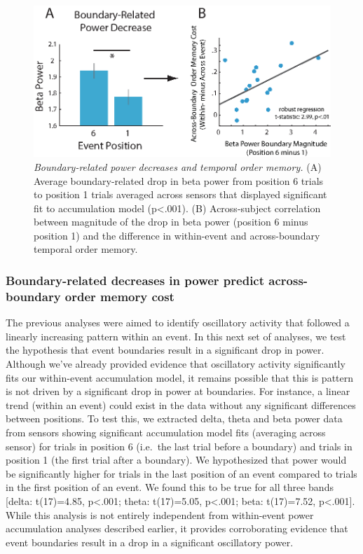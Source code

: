 \begin{figure}
  \centering
  \includegraphics[width=\textwidth]{figures/chapter2_figure5.eps}
  \caption[Boundary-related power decreases and temporal order memory.]{\textit{Boundary-related power decreases and temporal order memory.} (A) Average boundary-related drop in beta power from position 6 trials to position 1 trials averaged across sensors that displayed significant fit to accumulation model (p<.001).  (B) Across-subject correlation between magnitude of the drop in beta power (position 6 minus position 1) and the difference in within-event and across-boundary temporal order memory.}
  \label{chapter2_figure5}
\end{figure}

\subsubsection{Boundary-related decreases in power predict
across-boundary order memory
cost}\label{boundary-related-decreases-in-power-predict-across-boundary-order-memory-cost}

The previous analyses were aimed to identify oscillatory activity that
followed a linearly increasing pattern within an event. In this next set
of analyses, we test the hypothesis that event boundaries result in a
significant drop in power. Although we've already provided evidence that
oscillatory activity significantly fits our within-event accumulation
model, it remains possible that this is pattern is not driven by a
significant drop in power at boundaries. For instance, a linear trend
(within an event) could exist in the data without any significant
differences between positions. To test this, we extracted delta, theta
and beta power data from sensors showing significant accumulation model
fits (averaging across sensor) for trials in position 6 (i.e.~the last
trial before a boundary) and trials in position 1 (the first trial after
a boundary). We hypothesized that power would be significantly higher
for trials in the last position of an event compared to trials in the
first position of an event. We found this to be true for all three bands
{[}delta: t(17)=4.85, p\textless{}.001; theta: t(17)=5.05,
p\textless{}.001; beta: t(17)=7.52, p\textless{}.001{]}. While this
analysis is not entirely independent from within-event power
accumulation analyses described earlier, it provides corroborating
evidence that event boundaries result in a drop in a significant
oscillatory power.

